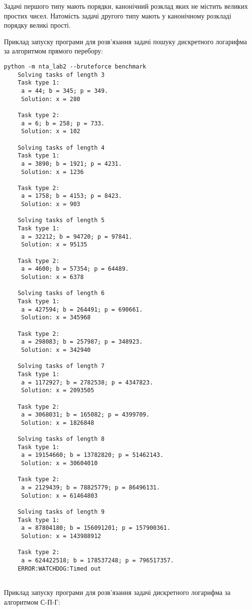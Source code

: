 Задачі першого типу мають порядки, канонічний розклад яких не містить
великих простих чисел. Натомість задачі другого типу мають у канонічному
розкладі порядку великі прості.

Приклад запуску програми для розв'язання задачі пошуку дискретного логарифма за алгоритмом прямого перебору:

\begin{lstlisting}
python -m nta_lab2 --bruteforce benchmark
    Solving tasks of length 3
    Task type 1:
     a = 44; b = 345; p = 349.
     Solution: x = 280
    
    Task type 2:
     a = 6; b = 258; p = 733.
     Solution: x = 102
    
    Solving tasks of length 4
    Task type 1:
     a = 3890; b = 1921; p = 4231.
     Solution: x = 1236
    
    Task type 2:
     a = 1758; b = 4153; p = 8423.
     Solution: x = 903
    
    Solving tasks of length 5
    Task type 1:
     a = 32212; b = 94720; p = 97841.
     Solution: x = 95135
    
    Task type 2:
     a = 4600; b = 57354; p = 64489.
     Solution: x = 6378
    
    Solving tasks of length 6
    Task type 1:
     a = 427594; b = 264491; p = 690661.
     Solution: x = 345968
    
    Task type 2:
     a = 298083; b = 257987; p = 348923.
     Solution: x = 342940
    
    Solving tasks of length 7
    Task type 1:
     a = 1172927; b = 2782538; p = 4347823.
     Solution: x = 2093505
    
    Task type 2:
     a = 3068031; b = 165082; p = 4399709.
     Solution: x = 1826848
    
    Solving tasks of length 8
    Task type 1:
     a = 19154660; b = 13782820; p = 51462143.
     Solution: x = 30604010
    
    Task type 2:
     a = 2129439; b = 78825779; p = 86496131.
     Solution: x = 61464803
    
    Solving tasks of length 9
    Task type 1:
     a = 87804180; b = 156091201; p = 157900361.
     Solution: x = 143988912
    
    Task type 2:
     a = 624422518; b = 178537248; p = 796517357.
    ERROR:WATCHDOG:Timed out
    
\end{lstlisting}

Приклад запуску програми для розв'язання задачі дискретного логарифма за алгоритмом С-П-Г:

